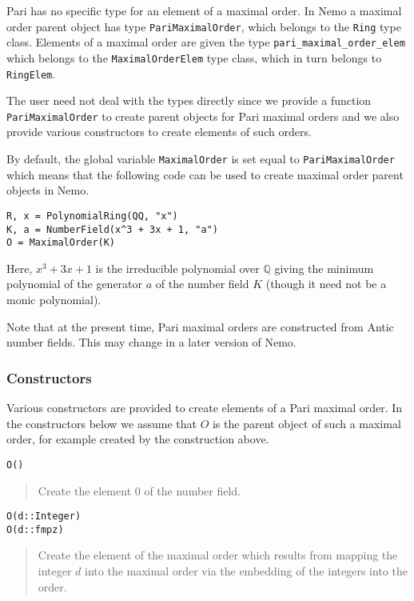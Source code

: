 \documentclass[a4paper,10pt]{article}
\newcommand{\Q}{\mathbb{Q}}
\newcommand{\code}{\lstinline}
\newcommand{\desc}[1]{\vspace{-3mm}\begin{quote}#1\end{quote}}
\begin{document}
{{Pari has no specific type for an element of a maximal order. In Nemo a maximal
order parent object has type \code{PariMaximalOrder}, which belongs to the
\code{Ring} type class. Elements of a maximal order are given the type
\code{pari_maximal_order_elem} which belongs to the \code{MaximalOrderElem}
type class, which in turn belongs to \code{RingElem}.

The user need not deal with the types directly since we provide a function
\code{PariMaximalOrder} to create parent objects for Pari maximal orders and we
also provide various constructors to create elements of such orders.

By default, the global variable \code{MaximalOrder} is set equal to
\code{PariMaximalOrder} which means that the following code can be used to
create maximal order parent objects in Nemo.

\begin{lstlisting}
R, x = PolynomialRing(QQ, "x")
K, a = NumberField(x^3 + 3x + 1, "a")
O = MaximalOrder(K)
\end{lstlisting}

Here, $x^3 + 3x + 1$ is the irreducible polynomial over $\Q$ giving the minimum
polynomial of the generator $a$ of the number field $K$ (though it need not be
a monic polynomial).

Note that at the present time, Pari maximal orders are constructed from Antic
number fields. This may change in a later version of Nemo.

\subsubsection{Constructors}

Various constructors are provided to create elements of a Pari maximal order.
In the constructors below we assume that $O$ is the parent object of such a maximal
order, for example created by the construction above.

\begin{lstlisting}
O()
\end{lstlisting}

\desc{Create the element $0$ of the number field.}

\begin{lstlisting}
O(d::Integer)
O(d::fmpz)
\end{lstlisting}

\desc{Create the element of the maximal order which results from mapping the
integer $d$ into the maximal order via the embedding of the integers into the
order.}

}}
\end{document}
